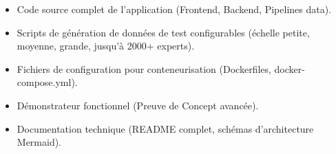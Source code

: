 \documentclass[12pt,a4paper]{article}
\begin{document}
\begin{itemize}[leftmargin=*]
    \item Code source complet de l'application (Frontend, Backend, Pipelines data).
    \item Scripts de génération de données de test configurables (échelle petite, moyenne, grande, jusqu'à 2000+ experts).
    \item Fichiers de configuration pour conteneurisation (Dockerfiles, docker-compose.yml).
    \item Démonstrateur fonctionnel (Preuve de Concept avancée).
    \item Documentation technique (README complet, schémas d'architecture Mermaid).
\end{itemize}
\end{document}
